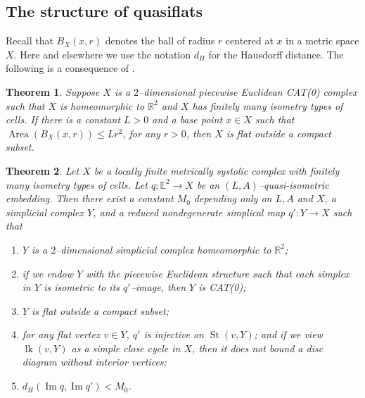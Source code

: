 \documentclass[11pt]{amsart}
\newcommand{\area}{\operatorname{Area}}
\newcommand{\lk}{\operatorname{lk}}
\newcommand{\St}{\operatorname{St}}
\newtheorem{theorem}{Theorem}[section]
\theoremstyle{definition}
\newcommand{\im}{\operatorname{Im}}
\begin{document}
\subsection{The structure of quasiflats}
Recall that $B_X(x,r)$ denotes the ball of radius $r$ centered at $x$ in a metric space $X$. Here and elsewhere we use the notation $d_H$ for the Hausdorff distance. The following is a consequence of \cite[Theorem 4.1]{bks}.
\begin{theorem}
	\label{thm:BKS}
Suppose $X$ is a $2$--dimensional piecewise Euclidean CAT(0) complex such that $X$ is homeomorphic to $\mathbb R^2$ and $X$ has finitely many isometry types of cells. If there is a constant $L>0$ and a base point $x\in X$ such that $\area(B_X(x,r))\le Lr^2$, for any $r>0$, then $X$ is flat outside a compact subset.
\end{theorem}

\begin{theorem}
	\label{thm:MSquasiflats}
Let $X$ be a locally finite metrically systolic complex with finitely many isometry types of cells. Let $q\colon \mathbb E^2\to X$ be an $(L,A)$--quasi-isometric embedding. Then there exist a constant $M_0$ depending only on $L,A$ and $X$, a simplicial complex $Y$, and a reduced nondegenerate simplical map $q'\colon Y\to X$ such that
\begin{enumerate}
\item $Y$ is a $2$--dimensional simplicial complex homeomorphic to $\mathbb R^2$;
\item if we endow $Y$ with the piecewise Euclidean structure such that each simplex in $Y$ is isometric to its $q'$--image, then $Y$ is CAT(0);
\item $Y$ is flat outside a compact subset;
\item for any flat vertex $v\in Y$, $q'$ is injective on $\St(v,Y)$; and if we view $\lk(v,Y)$ as a simple close cycle in $X$, then it does not bound a disc diagram without interior vertices;
\item $d_H(\im q,\im q')<M_0$.
\end{enumerate}
\end{theorem}
\end{document}
